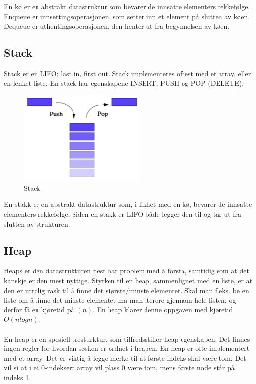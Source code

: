 \noindent En kø er en abstrakt datastruktur som bevarer de innsatte elementers rekkefølge. Enqueue er innsettingsoperasjonen, som setter inn et element på slutten av køen. Dequeue er uthentingsoperasjonen, den henter ut fra begynnelsen av køen.

\subsection{Stack}
Stack er en LIFO; last in, first out. Stack implementeres oftest med et array, eller en lenket liste. En stack har egenskapene INSERT, PUSH og POP (DELETE).

\begin{figure}[H]
\includegraphics[scale=0.7]{images/stack}
\centering %
\caption{Stack}
\label{fig:stack}
\end{figure}

\noindent En stakk er en abstrakt datastruktur som, i likhet med en kø, bevarer de innsatte elementers rekkefølge. Siden en stakk er LIFO både legger den til og tar ut fra slutten av strukturen.

\subsection{Heap}
Heaps er den datastrukturen flest har problem med å forstå, samtidig som at det kanskje er den mest nyttige. Styrken til en heap, sammenlignet med en liste, er at den er utrolig rask til å finne det største/minste elementet. Skal man f.eks. be en liste om å finne det minste elementet må man iterere gjennom hele listen, og derfor få en kjøretid på $(n)$. En heap klarer denne oppgaven med kjøretid $O(n log n)$. 
\\\\
En heap er en spesiell tresturktur, som tilfredsstiller heap-egenskapen. Det finnes ingen regler for hvordan søsken er ordnet i heapen. En heap er ofte implementert med et array. Det er viktig å legge merke til at første indeks skal være tom. Det vil si at i et 0-indeksert array vil plass 0 være tom, mens første node står på indeks 1.

